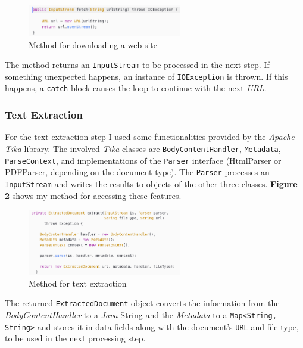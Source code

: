 \documentclass[a4paper]{usiinfbachelorproject}
\begin{document}
\begin{figure}[h!]
\centering
\includegraphics[width=0.6\textwidth]{figures/downloadMethod}
\caption{Method for downloading a web site}
\label{fig:downloadMethod}
\end{figure}

The method returns an \texttt{InputStream} to be processed in the next step. If something unexpected happens, an instance
 of \texttt{IOException} is thrown. If this happens, a \texttt{catch} block causes the loop to continue with
the next \emph{URL}. 

\subsubsection{Text Extraction}

For the text extraction step I used some functionalities provided by the \emph{Apache Tika} \cite{tikaHome} library.
The involved \emph{Tika} classes are \texttt{BodyContentHandler}, \texttt{Metadata}, \texttt{ParseContext}, and implementations of the
\texttt{Parser} interface (HtmlParser or PDFParser, depending on the document type). The \texttt{Parser} processes
an \texttt{InputStream} and writes the results to objects of the other three classes. 
\textbf{Figure \ref{fig:extractionMethod}} shows my method for accessing these features.

\begin{figure}[h!]
\centering
\includegraphics[width=0.6\textwidth]{figures/extractionMethod}
\caption{Method for text extraction}
\label{fig:extractionMethod}
\end{figure}

The returned \texttt{ExtractedDocument} object converts the information from the \emph{BodyContentHandler} to a \emph{Java}
String and the \emph{Metadata} to a \texttt{Map<String, String>} and stores it in data fields along with the document's \texttt{URL}
and file type, to be used in the next processing step. 
\end{document}

